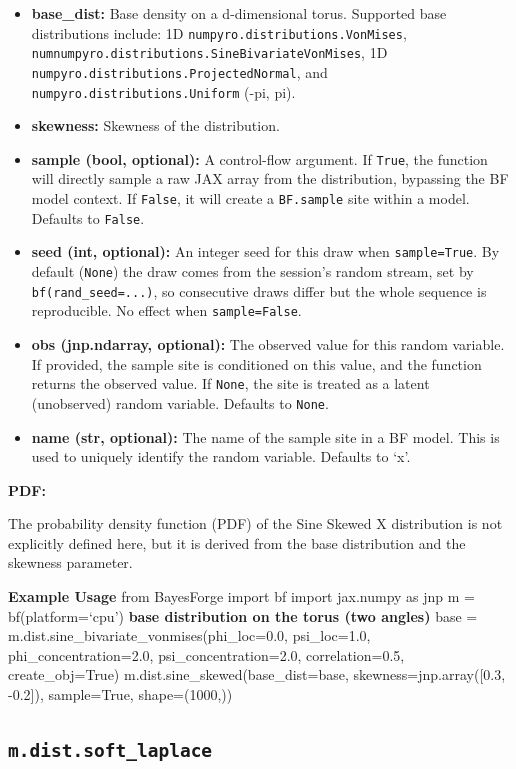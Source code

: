 \documentclass[
  letterpaper,
  DIV=11,
  numbers=noendperiod]{scrartcl}
\begin{document}
\begin{itemize}
\item
  \textbf{base\_dist:} Base density on a d-dimensional torus. Supported
  base distributions include: 1D
  \texttt{numpyro.distributions.VonMises},
  \texttt{numnumpyro.distributions.SineBivariateVonMises}, 1D
  \texttt{numpyro.distributions.ProjectedNormal}, and
  \texttt{numpyro.distributions.Uniform} (-pi, pi).
\item
  \textbf{skewness:} Skewness of the distribution.
\item
  \textbf{sample (bool, optional):} A control-flow argument. If
  \texttt{True}, the function will directly sample a raw JAX array from
  the distribution, bypassing the BF model context. If \texttt{False},
  it will create a \texttt{BF.sample} site within a model. Defaults to
  \texttt{False}.
\item
  \textbf{seed (int, optional):} An integer seed for this draw when
  \texttt{sample=True}. By default (\texttt{None}) the draw comes from
  the session's random stream, set by \texttt{bf(rand\_seed=...)}, so
  consecutive draws differ but the whole sequence is reproducible. No
  effect when \texttt{sample=False}.
\item
  \textbf{obs (jnp.ndarray, optional):} The observed value for this
  random variable. If provided, the sample site is conditioned on this
  value, and the function returns the observed value. If \texttt{None},
  the site is treated as a latent (unobserved) random variable. Defaults
  to \texttt{None}.
\item
  \textbf{name (str, optional):} The name of the sample site in a BF
  model. This is used to uniquely identify the random variable. Defaults
  to `x'.
\end{itemize}

\textbf{PDF:}

The probability density function (PDF) of the Sine Skewed X distribution
is not explicitly defined here, but it is derived from the base
distribution and the skewness parameter.

\textbf{Example Usage} from BayesForge import bf import jax.numpy as jnp
m = bf(platform=`cpu') \textbf{base distribution on the torus (two
angles)} base = m.dist.sine\_bivariate\_vonmises(phi\_loc=0.0,
psi\_loc=1.0, phi\_concentration=2.0, psi\_concentration=2.0,
correlation=0.5, create\_obj=True) m.dist.sine\_skewed(base\_dist=base,
skewness=jnp.array({[}0.3, -0.2{]}), sample=True, shape=(1000,))

\subsection{\texorpdfstring{\texttt{m.dist.soft\_laplace}}{m.dist.soft\_laplace}}\label{soft_laplace}
\end{document}
